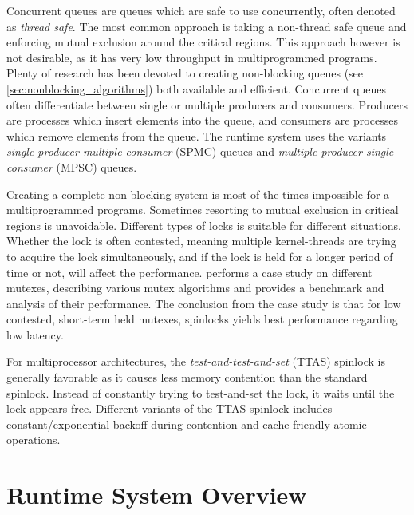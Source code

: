 Concurrent queues are queues which are safe to use concurrently, often denoted as \textit{thread safe}. The most common approach is taking a non\hyp{}thread safe queue and enforcing mutual exclusion around the critical regions. This approach however is not desirable, as it has very low throughput in multiprogrammed programs. Plenty of research \citep[e.g.][]{chase2005dynamic,le2013correct} has been devoted to creating non\hyp{}blocking queues (see \cref{sec:nonblocking_algorithms}) both available and efficient. Concurrent queues often differentiate between single or multiple producers and consumers. Producers are processes which insert elements into the queue, and consumers are processes which remove elements from the queue. The runtime system uses the variants \textit{single\hyp{}producer\hyp{}multiple\hyp{}consumer} (SPMC) queues and \textit{multiple\hyp{}producer\hyp{}single\hyp{}consumer} (MPSC) queues.

Creating a complete non\hyp{}blocking system is most of the times impossible for a multiprogrammed programs. Sometimes resorting to mutual exclusion in critical regions is unavoidable. Different types of locks is suitable for different situations. Whether the lock is often contested, meaning multiple kernel\hyp{}threads are trying to acquire the lock simultaneously, and if the lock is held for a longer period of time or not, will affect the performance.  performs a case study on different mutexes, describing various mutex algorithms and provides a benchmark and analysis of their performance. The conclusion from the case study is that for low contested, short\hyp{}term held mutexes, spinlocks yields best performance regarding low latency. 

For multiprocessor architectures, the \textit{test\hyp{}and\hyp{}test\hyp{}and\hyp{}set} (TTAS) spinlock is generally favorable as it causes less memory contention than the standard spinlock. Instead of constantly trying to test\hyp{}and\hyp{}set the lock, it waits until the lock appears free. Different variants of the TTAS spinlock includes constant/exponential backoff during contention and cache friendly atomic operations.


\FloatBarrier
\section{Runtime System Overview}
\label{sec:runtime_system_overview}

